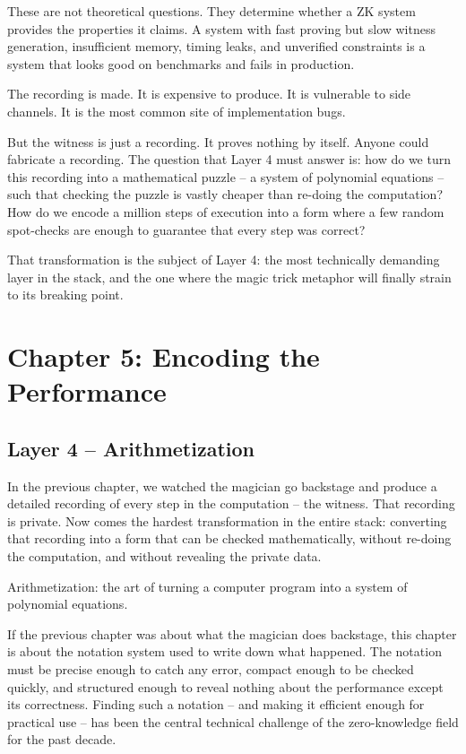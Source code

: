 \documentclass[
  11pt,
  openany]{report}
\begin{document}
These are not theoretical questions. They determine whether a ZK system provides
the properties it claims. A system with fast proving but slow witness
generation, insufficient memory, timing leaks, and unverified constraints is a
system that looks good on benchmarks and fails in production.

\par\vspace{18pt}

The recording is made. It is expensive to produce. It is vulnerable to side
channels. It is the most common site of implementation bugs.

But the witness is just a recording. It proves nothing by itself. Anyone could
fabricate a recording. The question that Layer 4 must answer is: how do we turn
this recording into a mathematical puzzle -- a system of polynomial equations --
such that checking the puzzle is vastly cheaper than re-doing the computation?
How do we encode a million steps of execution into a form where a few random
spot-checks are enough to guarantee that every step was correct?

That transformation is the subject of Layer 4: the most technically demanding
layer in the stack, and the one where the magic trick metaphor will finally
strain to its breaking point.

\chapter{Chapter 5: Encoding the
Performance}\label{chapter-5-encoding-the-performance}

\section{Layer 4 -- Arithmetization}\label{layer-4-arithmetization}

In the previous chapter, we watched the magician go backstage and produce a
detailed recording of every step in the computation -- the witness. That
recording is private. Now comes the hardest transformation in the entire stack:
converting that recording into a form that can be checked mathematically,
without re-doing the computation, and without revealing the private data.

Arithmetization: the art of turning a computer program into a system of
polynomial equations.

If the previous chapter was about what the magician does backstage, this chapter
is about the notation system used to write down what happened. The notation must
be precise enough to catch any error, compact enough to be checked quickly, and
structured enough to reveal nothing about the performance except its
correctness. Finding such a notation -- and making it efficient enough for
practical use -- has been the central technical challenge of the zero-knowledge
field for the past decade.
\end{document}
